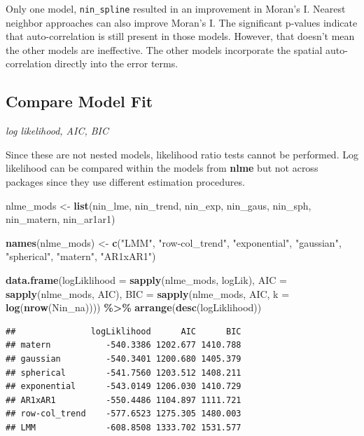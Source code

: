 \documentclass[
]{book}
\newenvironment{Shaded}{\begin{snugshade}}{\end{snugshade}}
\newcommand{\AttributeTok}[1]{\textcolor[rgb]{0.13,0.29,0.53}{#1}}
\newcommand{\FunctionTok}[1]{\textcolor[rgb]{0.13,0.29,0.53}{\textbf{#1}}}
\newcommand{\NormalTok}[1]{#1}
\newcommand{\OtherTok}[1]{\textcolor[rgb]{0.56,0.35,0.01}{#1}}
\newcommand{\SpecialCharTok}[1]{\textcolor[rgb]{0.81,0.36,0.00}{\textbf{#1}}}
\newcommand{\StringTok}[1]{\textcolor[rgb]{0.31,0.60,0.02}{#1}}
\begin{document}
Only one model, \texttt{nin\_spline} resulted in an improvement in Moran's I. Nearest neighbor approaches can also improve Moran's I. The significant p-values indicate that auto-correlation is still present in those models. However, that doesn't mean the other models are ineffective. The other models incorporate the spatial auto-correlation directly into the error terms.

\hypertarget{compare-model-fit}{%
\subsection{Compare Model Fit}\label{compare-model-fit}}

\emph{log likelihood, AIC, BIC}

Since these are not nested models, likelihood ratio tests cannot be performed. Log likelihood can be compared within the models from \textbf{nlme} but not across packages since they use different estimation procedures.

\begin{Shaded}
\begin{Highlighting}[]
\NormalTok{nlme\_mods }\OtherTok{\textless{}{-}} \FunctionTok{list}\NormalTok{(nin\_lme, nin\_trend, nin\_exp, nin\_gaus, nin\_sph, nin\_matern, nin\_ar1ar1)}

\FunctionTok{names}\NormalTok{(nlme\_mods) }\OtherTok{\textless{}{-}} \FunctionTok{c}\NormalTok{(}\StringTok{"LMM"}\NormalTok{, }\StringTok{"row{-}col\_trend"}\NormalTok{, }\StringTok{"exponential"}\NormalTok{, }
                        \StringTok{"gaussian"}\NormalTok{, }\StringTok{"spherical"}\NormalTok{, }\StringTok{"matern"}\NormalTok{, }\StringTok{"AR1xAR1"}\NormalTok{)}

\FunctionTok{data.frame}\NormalTok{(}\AttributeTok{logLiklihood =} \FunctionTok{sapply}\NormalTok{(nlme\_mods, logLik),}
           \AttributeTok{AIC =} \FunctionTok{sapply}\NormalTok{(nlme\_mods, AIC),}
           \AttributeTok{BIC =} \FunctionTok{sapply}\NormalTok{(nlme\_mods, AIC, }\AttributeTok{k =} \FunctionTok{log}\NormalTok{(}\FunctionTok{nrow}\NormalTok{(Nin\_na)))) }\SpecialCharTok{\%\textgreater{}\%} \FunctionTok{arrange}\NormalTok{(}\FunctionTok{desc}\NormalTok{(logLiklihood))}
\end{Highlighting}
\end{Shaded}

\begin{verbatim}
##               logLiklihood      AIC      BIC
## matern           -540.3386 1202.677 1410.788
## gaussian         -540.3401 1200.680 1405.379
## spherical        -541.7560 1203.512 1408.211
## exponential      -543.0149 1206.030 1410.729
## AR1xAR1          -550.4486 1104.897 1111.721
## row-col_trend    -577.6523 1275.305 1480.003
## LMM              -608.8508 1333.702 1531.577
\end{verbatim}
\end{document}
